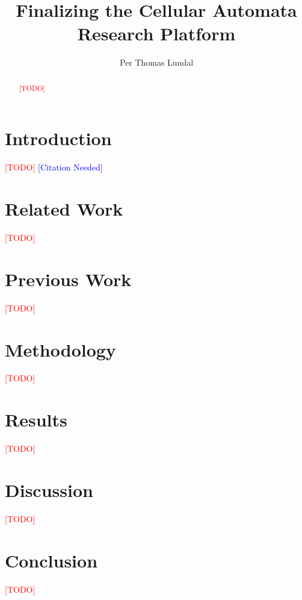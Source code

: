 \documentclass[a4paper]{IEEEtran}
\title{Finalizing the Cellular Automata Research Platform}
\author{Per Thomas Lundal}
\newcommand\TODO{\textcolor{red}{[TODO]}}
\newcommand\CN{\textcolor{blue}{[Citation Needed]}}
\begin{document}
\maketitle

\begin{abstract}

\TODO
\cite{test}

\end{abstract}

\section{Introduction}

\TODO
\CN

\section{Related Work}

\TODO

\section{Previous Work}

\TODO

\section{Methodology}

\TODO

\section{Results}

\TODO

\section{Discussion}

\TODO

\section{Conclusion}

\TODO



\nocite{*}
\end{document}
